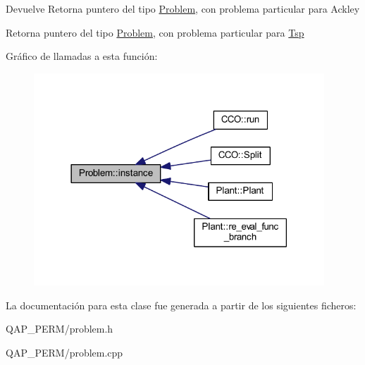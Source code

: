 \begin{DoxyReturn}{Devuelve}
Retorna puntero del tipo \hyperlink{class_problem}{Problem}, con problema particular para Ackley

Retorna puntero del tipo \hyperlink{class_problem}{Problem}, con problema particular para \hyperlink{class_tsp}{Tsp} 
\end{DoxyReturn}


Gráfico de llamadas a esta función\+:
\nopagebreak
\begin{figure}[H]
\begin{center}
\leavevmode
\includegraphics[width=309pt]{class_problem_a4455f10e5a7e568a4c4359c53e73c547_icgraph}
\end{center}
\end{figure}




La documentación para esta clase fue generada a partir de los siguientes ficheros\+:\begin{DoxyCompactItemize}
\item 
Q\+A\+P\+\_\+\+P\+E\+R\+M/problem.\+h\item 
Q\+A\+P\+\_\+\+P\+E\+R\+M/problem.\+cpp\end{DoxyCompactItemize}
